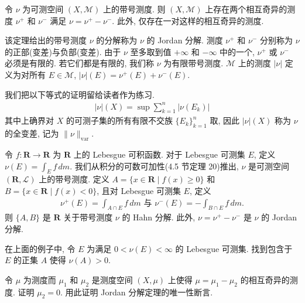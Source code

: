 \documentclass[../../main.tex]{subfiles}
\begin{document}
\begin{theorem}\label{theorem:ch17-jordan-decomposition}
令 $\nu$ 为可测空间 $(X,\mathcal{M})$ 上的带号测度. 则 $(X,\mathcal{M})$ 上存在两个相互奇异的测度 $\nu^{+}$ 和 $\nu^{-}$ 满足 $\nu=\nu^{+}-\nu^{-}$. 此外, 仅存在一对这样的相互奇异的测度.
\end{theorem}

该定理给出的带号测度 $\nu$ 的分解称为 $\nu$ 的 Jordan 分解. 测度 $\nu^{+}$ 和 $\nu^{-}$ 分别称为 $\nu$ 的正部(变差)与负部(变差). 由于 $\nu$ 至多取到值 $+\infty$ 和 $-\infty$ 中的一个, $\nu^{+}$ 或 $\nu^{-}$ 必须是有限的. 若它们都是有限的, 我们称 $\nu$ 为有限带号测度. $\mathcal{M}$ 上的测度 $|\nu|$ 定义为对所有 $E\in\mathcal{M}$, $|\nu|(E)=\nu^{+}(E)+\nu^{-}(E)$.

我们把以下等式的证明留给读者作为练习.
\begin{align}
|\nu|(X)=\sup\sum_{k=1}^{n}|\nu(E_{k})|\label{align:ch17-total-variation}
\end{align}
其中上确界对 $X$ 的可测子集的所有有限不交族 $\{E_{k}\}_{k=1}^{n}$ 取, 因此 $|\nu|(X)$ 称为 $\nu$ 的全变差, 记为 $\|\nu\|_{\mathrm{var}}$.

\begin{example}\label{example:ch17-signed-measure-integral}
令 $f:\mathbf{R}\to\mathbf{R}$ 为 $\mathbf{R}$ 上的 Lebesgue 可积函数. 对于 Lebesgue 可测集 $E$, 定义 $\nu(E)=\int_{E}f\,dm$. 我们从积分的可数可加性(4.5 节定理 20)推出, $\nu$ 是可测空间 $(\mathbf{R},\mathcal{L})$ 上的带号测度. 定义 $A=\{x\in\mathbf{R}\mid f(x)\geqslant 0\}$ 和 $B=\{x\in\mathbf{R}\mid f(x)<0\}$, 且对 Lebesgue 可测集 $E$, 定义
\begin{align*}
\nu^{+}(E)=\int_{A\cap E}f\,dm\text{ 与 }\nu^{-}(E)=-\int_{B\cap E}f\,dm.
\end{align*}
则 $\{A,B\}$ 是 $\mathbf{R}$ 关于带号测度 $\nu$ 的 Hahn 分解. 此外, $\nu=\nu^{+}-\nu^{-}$ 是 $\nu$ 的 Jordan 分解.
\end{example}

\begin{exercise}\label{exercise:ch17-12}
在上面的例子中, 令 $E$ 为满足 $0<\nu(E)<\infty$ 的 Lebesgue 可测集. 找到包含于 $E$ 的正集 $A$ 使得 $\nu(A)>0$.
\end{exercise}

\begin{exercise}\label{exercise:ch17-13}
令 $\mu$ 为测度而 $\mu_{1}$ 和 $\mu_{2}$ 是测度空间 $(X,\mu)$ 上使得 $\mu=\mu_{1}-\mu_{2}$ 的相互奇异的测度. 证明 $\mu_{2}=0$. 用此证明 Jordan 分解定理的唯一性断言.
\end{exercise}
\end{document}
